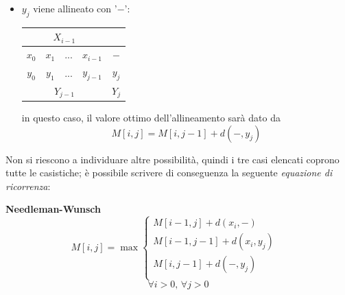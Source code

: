 \begin{itemize}
        \item $y_j$ viene allineato con '$-$': 
        \vspace{5pt}
        \begin{table}[h]
            \centering
            \begin{tabular}{|cccc|c|}
            \hline
                \multicolumn{4}{|c|}{$X_{i-1}$} & \\
            \hline
                $x_0$ & $x_1$ & ... & $x_{i-1}$ & $-$ \\
                 $y_0$ & $y_1$ & ... & $y_{j-1}$ & $y_j$ \\
            \hline
                \multicolumn{4}{|c|}{$Y_{j-1}$} & $Y_j$\\
            \hline
            \end{tabular}
        \end{table}
        \vspace{5pt}
        
        in questo caso, il valore ottimo dell'allineamento sarà dato da
        $$M[i, j] = M[i, j-1] + d(-, y_j)$$
    \end{itemize}
    Non si riescono a individuare altre possibilità, quindi i tre casi elencati coprono tutte le casistiche; è possibile scrivere di conseguenza la seguente \emph{equazione di ricorrenza}:
    
    \vspace{20pt}
    \textbf{Needleman-Wunsch} \cite{NeedlemanWunsch}
    \begin{equation}
        M[i, j] = \max \begin{cases}
            M[i-1, j] + d(x_i, -) & \\
            M[i-1, j-1] + d(x_i, y_j) & \\
            M[i, j-1] + d(-, y_j) & \\
        \end{cases}
        \label{needleman-wunsch}
    \end{equation}
    $$\forall i > 0, \, \forall j > 0$$

